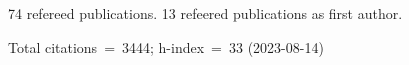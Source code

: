 74 refereed publications. 13 refeered publications as first author.

Total citations~=~3444; h-index~=~33 (2023-08-14)